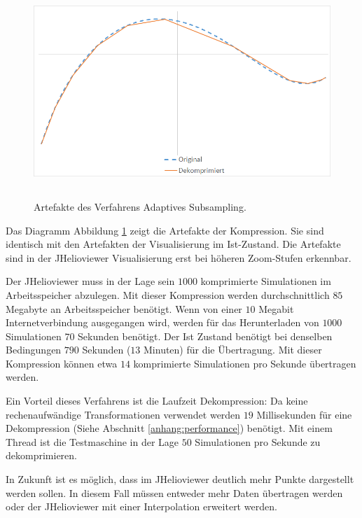 \begin{figure}[!htbp]
	\center
	\includegraphics[width=1\textwidth,height=8cm,keepaspectratio]{./pictures/resultate/loesung0/loesung0_artefakte.png}
	\caption{Artefakte des Verfahrens Adaptives Subsampling.}
	\label{resultate:loesung0:artefakte}
\end{figure}
Das Diagramm Abbildung \ref{resultate:loesung0:artefakte} zeigt die Artefakte der Kompression. Sie sind identisch mit den Artefakten der Visualisierung im Ist-Zustand. Die Artefakte sind in der JHelioviewer Visualisierung erst bei höheren Zoom-Stufen erkennbar.

Der JHelioviewer muss in der Lage sein $1000$ komprimierte Simulationen im Arbeitsspeicher abzulegen. Mit dieser Kompression werden durchschnittlich $85$ Megabyte an Arbeitsspeicher benötigt. Wenn von einer $10$ Megabit Internetverbindung ausgegangen wird, werden für das Herunterladen von $1000$ Simulationen $70$ Sekunden benötigt. Der Ist Zustand benötigt bei denselben Bedingungen $790$ Sekunden ($13$ Minuten) für die Übertragung. Mit dieser Kompression können etwa $14$ komprimierte Simulationen pro Sekunde übertragen werden. 

Ein Vorteil dieses Verfahrens ist die Laufzeit Dekompression: Da keine rechenaufwändige Transformationen verwendet werden $19$ Millisekunden für eine Dekompression (Siehe Abschnitt \ref{anhang:performance}) benötigt. Mit einem Thread ist die Testmaschine in der Lage $50$ Simulationen pro Sekunde zu dekomprimieren.

In Zukunft ist es möglich, dass im JHelioviewer deutlich mehr Punkte dargestellt werden sollen. In diesem Fall müssen entweder mehr Daten übertragen werden oder der JHelioviewer mit einer Interpolation erweitert werden.
